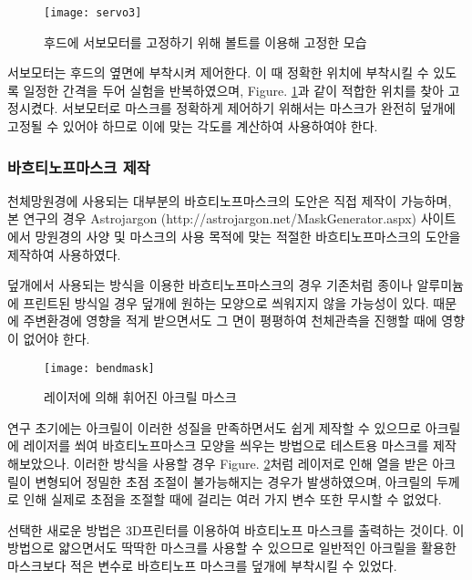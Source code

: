 \begin{figure}[ht]
	\begin{center}
		\texttt{[image: servo3]}
	\end{center}
	\caption{후드에 서보모터를 고정하기 위해 볼트를 이용해 고정한 모습}
	\label{servo}
\end{figure}


서보모터는 후드의 옆면에 부착시켜 제어한다. 이 때 정확한 위치에 부착시킬 수 있도록 일정한 간격을 두어 실험을 반복하였으며, \textrm{Figure}. \ref{servo}과 같이 적합한 위치를 찾아 고정시켰다. 서보모터로 마스크를 정확하게 제어하기 위해서는 마스크가 완전히 덮개에 고정될 수 있어야 하므로 이에 맞는 각도를 계산하여 사용하여야 한다.

\newpage
\subsubsection{바흐티노프마스크 제작}
천체망원경에 사용되는 대부분의 바흐티노프마스크의 도안은 직접 제작이 가능하며, 본 연구의 경우 Astrojargon (http://astrojargon.net/MaskGenerator.aspx) 사이트에서 망원경의 사양 및 마스크의 사용 목적에 맞는 적절한 바흐티노프마스크의 도안을 제작하여 사용하였다.

덮개에서 사용되는 방식을 이용한 바흐티노프마스크의 경우 기존처럼 종이나 알루미늄에 프린트된 방식일 경우 덮개에 원하는 모양으로 씌워지지 않을 가능성이 있다. 때문에 주변환경에 영향을 적게 받으면서도 그 면이 평평하여 천체관측을 진행할 때에 영향이 없어야 한다. 

\begin{figure}[h]
	\begin{center}
		\texttt{[image: bendmask]}
	\end{center}
	\caption{레이저에 의해 휘어진 아크릴 마스크}
	\label{bendmask}
\end{figure}


연구 초기에는 아크릴이 이러한 성질을 만족하면서도 쉽게 제작할 수 있으므로 아크릴에 레이저를 쐬여 바흐티노프마스크 모양을 씌우는 방법으로 테스트용 마스크를 제작해보았으나. 이러한 방식을 사용할 경우 \textrm{Figure}. \ref{bendmask}처럼 레이저로 인해 열을 받은 아크릴이 변형되어 정밀한 초점 조절이 불가능해지는 경우가 발생하였으며, 아크릴의 두께로 인해 실제로 초점을 조절할 때에 걸리는 여러 가지 변수 또한 무시할 수 없었다.

선택한 새로운 방법은 3D프린터를 이용하여 바흐티노프 마스크를 출력하는 것이다. 이 방법으로 얇으면서도 딱딱한 마스크를 사용할 수 있으므로 일반적인 아크릴을 활용한 마스크보다 적은 변수로 바흐티노프 마스크를 덮개에 부착시킬 수 있었다.

